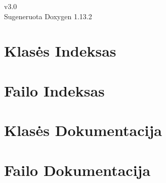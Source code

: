 \documentclass[twoside]{book}
\newcommand{\+}{\discretionary{\mbox{\scriptsize$\hookleftarrow$}}{}{}}
\newcommand{\clearemptydoublepage}{%
    \newpage{\pagestyle{empty}\cleardoublepage}%
  }
\begin{document}
  \raggedbottom
    \hypersetup{pageanchor=false,
                bookmarksnumbered=true,
                pdfencoding=unicode
               }
  \begin{titlepage}
  \vspace*{7cm}
  \begin{center}%
  {\Large v3.\+0}\\
  \vspace*{1cm}
  {\large Sugeneruota Doxygen 1.13.2}\\
  \end{center}
  \end{titlepage}
  \clearemptydoublepage
  \tableofcontents
  \clearemptydoublepage
  \hypersetup{pageanchor=true}
\chapter{Klasės Indeksas}

\chapter{Failo Indeksas}

\chapter{Klasės Dokumentacija}

\chapter{Failo Dokumentacija}




  \backmatter
  \newpage
  \clearemptydoublepage
  \printindex
\end{document}
